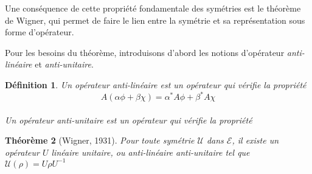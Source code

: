 \documentclass{report}
\numberwithin{equation}{part}
\newtheorem{theorem}{Théorème}[section]
\newtheorem{definition}[theorem]{Définition}
\begin{document}
Une conséquence de cette propriété fondamentale des symétries est le théorème de Wigner, qui permet de faire le lien entre la symétrie et sa représentation sous forme d'opérateur.

Pour les besoins du théorème, introduisons d'abord les notions d'opérateur \emph{anti-linéaire} et \emph{anti-unitaire}.

\begin{definition}
  Un opérateur \emph{anti-linéaire} est un opérateur qui vérifie la propriété
  $$ A(\alpha\phi + \beta\chi) = \alpha^* A\phi + \beta^* A\chi $$ \\
  Un opérateur \emph{anti-unitaire} est un opérateur qui vérifie la propriété
\end{definition}

\begin{theorem}[Wigner, 1931]
Pour toute symétrie $\mathcal{U}$ dans $\mathcal{E}$, il existe un opérateur $U$ linéaire unitaire, ou anti-linéaire anti-unitaire tel que $\mathcal{U}(\rho) = U\rho U^{-1}$
\end{theorem}
\end{document}
